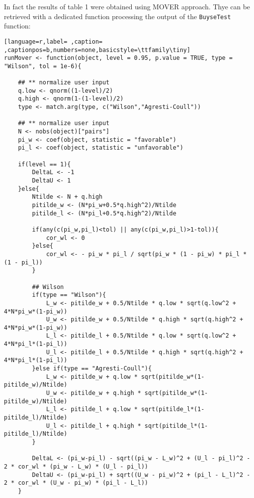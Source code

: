 \documentclass[12pt]{article}
\begin{document}
In fact the results of table 1 were obtained using MOVER
approach. Thye can be retrieved with a dedicated function processing
the output of the \texttt{BuyseTest} function:

\begin{lstlisting}[language=r,label= ,caption= ,captionpos=b,numbers=none,basicstyle=\ttfamily\tiny]
runMover <- function(object, level = 0.95, p.value = TRUE, type = "Wilson", tol = 1e-6){
    
    ## ** normalize user input
    q.low <- qnorm((1-level)/2)
    q.high <- qnorm(1-(1-level)/2)
    type <- match.arg(type, c("Wilson","Agresti-Coull"))
    
    ## ** normalize user input
    N <- nobs(object)["pairs"]
    pi_w <- coef(object, statistic = "favorable")
    pi_l <- coef(object, statistic = "unfavorable")

    if(level == 1){
        DeltaL <- -1
        DeltaU <- 1
    }else{
        Ntilde <- N + q.high
        pitilde_w <- (N*pi_w+0.5*q.high^2)/Ntilde
        pitilde_l <- (N*pi_l+0.5*q.high^2)/Ntilde

        if(any(c(pi_w,pi_l)<tol) || any(c(pi_w,pi_l)>1-tol)){
            cor_wl <- 0
        }else{
            cor_wl <- - pi_w * pi_l / sqrt(pi_w * (1 - pi_w) * pi_l * (1 - pi_l))
        }

        ## Wilson
        if(type == "Wilson"){
            L_w <- pitilde_w + 0.5/Ntilde * q.low * sqrt(q.low^2 + 4*N*pi_w*(1-pi_w))
            U_w <- pitilde_w + 0.5/Ntilde * q.high * sqrt(q.high^2 + 4*N*pi_w*(1-pi_w))
            L_l <- pitilde_l + 0.5/Ntilde * q.low * sqrt(q.low^2 + 4*N*pi_l*(1-pi_l))
            U_l <- pitilde_l + 0.5/Ntilde * q.high * sqrt(q.high^2 + 4*N*pi_l*(1-pi_l))
        }else if(type == "Agresti-Coull"){
            L_w <- pitilde_w + q.low * sqrt(pitilde_w*(1-pitilde_w)/Ntilde)
            U_w <- pitilde_w + q.high * sqrt(pitilde_w*(1-pitilde_w)/Ntilde)
            L_l <- pitilde_l + q.low * sqrt(pitilde_l*(1-pitilde_l)/Ntilde)
            U_l <- pitilde_l + q.high * sqrt(pitilde_l*(1-pitilde_l)/Ntilde)
        }

        DeltaL <- (pi_w-pi_l) - sqrt((pi_w - L_w)^2 + (U_l - pi_l)^2 - 2 * cor_wl * (pi_w - L_w) * (U_l - pi_l))
        DeltaU <- (pi_w-pi_l) + sqrt((U_w - pi_w)^2 + (pi_l - L_l)^2 - 2 * cor_wl * (U_w - pi_w) * (pi_l - L_l))
    }


\end{lstlisting}
\end{document}
